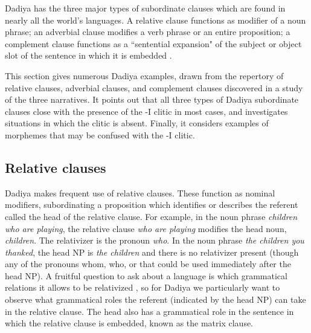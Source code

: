 \documentclass[output=paper]{langscibook}
\begin{document}
Dadiya has the three major types of subordinate clauses which are found in nearly all the world's languages. A relative clause functions as modifier of a noun phrase; an adverbial clause modifies a verb phrase or an entire proposition; a complement clause functions as a ``sentential expansion" of the subject or object slot of the sentence in which it is embedded \citep[374]{Longacre2007}. 

This section gives numerous Dadiya examples, drawn from the repertory of relative clauses, adverbial clauses, and complement clauses discovered in a study of the three narratives. It points out that all three types of Dadiya subordinate clauses close with the presence of the -I clitic in most cases, and investigates situations in which the clitic is absent. Finally, it  considers examples of morphemes that may be confused with the -I clitic.

\subsection{Relative clauses}

Dadiya makes frequent use of relative clauses. These function as nominal modifiers, subordinating a proposition which identifies or describes the referent called the head of the relative clause. For example, in the noun phrase \textit{children who are playing}, the relative clause \textit{who are playing} modifies the head noun, \textit{children}. The relativizer is the pronoun \textit{who}. In the noun phrase \textit{the children you thanked}, the head NP is \textit{the children} and there is no relativizer present (though any of the pronouns whom, who, or that could be used immediately after the head NP). A fruitful question to ask about a language is which grammatical relations it allows to be relativized \citep[326]{Payne1997}, so for Dadiya we particularly want to observe what grammatical roles the referent (indicated by the head NP) can take in the relative clause. The head also has a grammatical role in the sentence in which the relative clause is embedded, known as the matrix clause.
\end{document}
